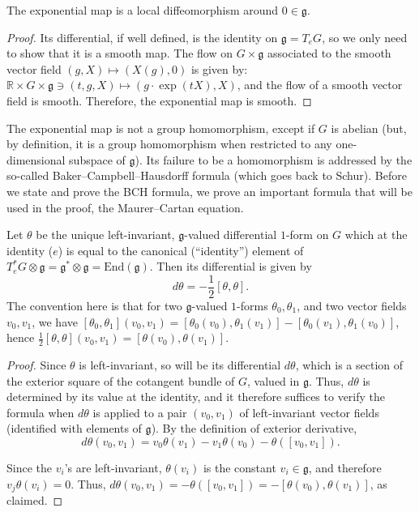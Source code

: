 \begin{lemma}
\label{lemma-exponential-localdiffeomorphism}
 The exponential map is a local diffeomorphism around $0\in \mathfrak g$. 
\end{lemma}

\begin{proof}
 Its differential, if well defined, is the identity on $\mathfrak g=T_eG$, so we only need to show that it is a smooth map. The flow on $G\times\mathfrak g$ associated to the smooth vector field $(g,X)\mapsto (X(g),0)$ is given by: $\mathbb R\times G\times\mathfrak g\ni (t,g,X)\mapsto (g\cdot \exp(tX), X)$, and the flow of a smooth vector field is smooth. Therefore, the exponential map is smooth.
\end{proof}


The exponential map is not a group homomorphism, except if $G$ is abelian (but, by definition, it is a group homomorphism when restricted to any one-dimensional subspace of $\mathfrak g$). Its failure to be a homomorphism is addressed by the so-called Baker--Campbell--Hausdorff formula (which goes back to Schur).
Before we state and prove the BCH formula, we prove an important formula that will be used in the proof, the Maurer--Cartan equation. 

\begin{theorem}
\label{theorem-Maurer-Cartan}
Let $\theta$ be the unique left-invariant, $\mathfrak g$-valued differential $1$-form on $G$ which at the identity ($e$) is equal to the canonical (``identity'') element of $T_e^*G\otimes \mathfrak g = \mathfrak g^* \otimes \mathfrak g = \text{End}(\mathfrak g)$.  Then its differential is given by 
\begin{equation}
\label{equation-Maurer-Cartan}
 d\theta = - \frac{1}{2} [\theta,\theta].
\end{equation}
The convention here is that for two $\mathfrak g$-valued $1$-forms $\theta_0, \theta_1$, and two vector fields $v_0, v_1$, we have $[\theta_0,\theta_1](v_0, v_1) = [\theta_0(v_0),\theta_1(v_1)] - [\theta_0(v_1),\theta_1(v_0)]$, hence $\frac{1}{2} [\theta,\theta](v_0,v_1) = [\theta(v_0),\theta(v_1)]$.
\end{theorem}


\begin{proof}
 Since $\theta$ is left-invariant, so will be its differential $d\theta$, which is a section of the exterior square of the cotangent bundle of $G$, valued in $\mathfrak g$. Thus, $d\theta$ is determined by its value at the identity, and it therefore suffices to verify the formula when $d\theta$ is applied to a pair $(v_0,v_1)$ of left-invariant vector fields (identified with elements of $\mathfrak g$). By the definition of exterior derivative,
 $$ d\theta(v_0,v_1) = v_0 \theta(v_1) - v_1 \theta(v_0) - \theta([v_0,v_1]).$$
 
 Since the $v_i$'s are left-invariant, $\theta(v_i)$ is the constant $v_i\in \mathfrak g$, and therefore $v_j \theta(v_i)=0$. Thus, $d\theta(v_0,v_1) = - \theta([v_0,v_1]) = - [\theta(v_0), \theta(v_1)]$, as claimed.
\end{proof}



